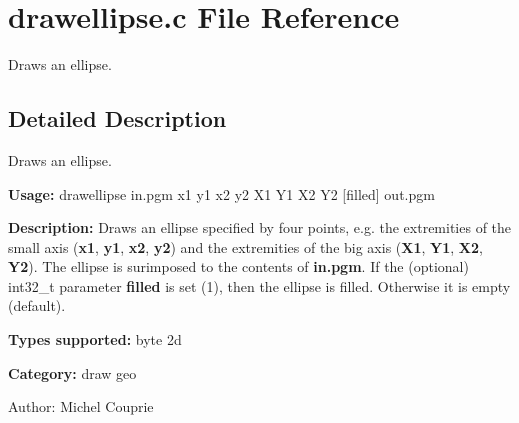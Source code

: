 \section{drawellipse.c File Reference}
\label{drawellipse_8c}
Draws an ellipse.  




\label{_details}
\subsection{Detailed Description}
Draws an ellipse. 

{\bf Usage:} drawellipse in.pgm x1 y1 x2 y2 X1 Y1 X2 Y2 [filled] out.pgm

{\bf Description:} Draws an ellipse specified by four points, e.g. the extremities of the small axis ({\bf x1}, {\bf y1}, {\bf x2}, {\bf y2}) and the extremities of the big axis ({\bf X1}, {\bf Y1}, {\bf X2}, {\bf Y2}). The ellipse is surimposed to the contents of {\bf in.pgm}. If the (optional) int32\_\-t parameter {\bf filled} is set (1), then the ellipse is filled. Otherwise it is empty (default).

{\bf Types supported:} byte 2d

{\bf Category:} draw geo

\begin{Desc}
\item[Author:]Michel Couprie \end{Desc}
